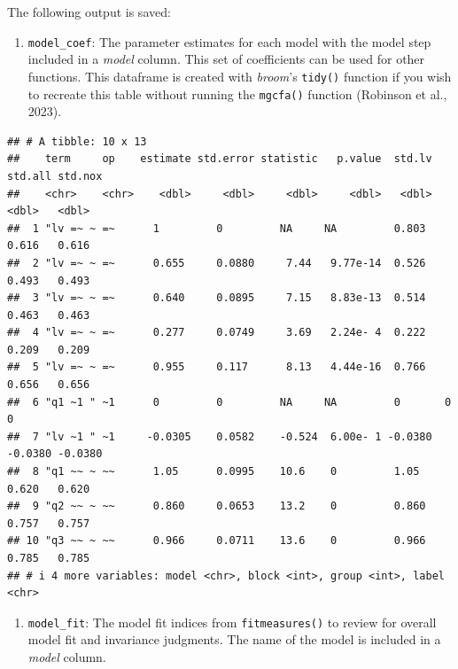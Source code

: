 \documentclass[
  man]{apa7}
\newenvironment{Shaded}{\begin{snugshade}}{\end{snugshade}}
\newcommand{\DecValTok}[1]{\textcolor[rgb]{0.00,0.00,0.81}{#1}}
\newcommand{\NormalTok}[1]{#1}
\newcommand{\SpecialCharTok}[1]{\textcolor[rgb]{0.81,0.36,0.00}{\textbf{#1}}}
\providecommand{\tightlist}{%
  \setlength{\itemsep}{0pt}\setlength{\parskip}{0pt}}
\begin{document}
The following output is saved:

\begin{enumerate}
\def\labelenumi{\arabic{enumi})}
\tightlist
\item
  \texttt{model\_coef}: The parameter estimates for each model with the model step included in a \emph{model} column. This set of coefficients can be used for other functions. This dataframe is created with \emph{broom}'s \texttt{tidy()} function if you wish to recreate this table without running the \texttt{mgcfa()} function (Robinson et al., 2023).
\end{enumerate}

\small

\begin{Shaded}
\end{Shaded}

\normalsize

\begin{verbatim}
## # A tibble: 10 x 13
##    term     op    estimate std.error statistic   p.value  std.lv std.all std.nox
##    <chr>    <chr>    <dbl>     <dbl>     <dbl>     <dbl>   <dbl>   <dbl>   <dbl>
##  1 "lv =~ ~ =~      1         0         NA     NA         0.803   0.616   0.616 
##  2 "lv =~ ~ =~      0.655     0.0880     7.44   9.77e-14  0.526   0.493   0.493 
##  3 "lv =~ ~ =~      0.640     0.0895     7.15   8.83e-13  0.514   0.463   0.463 
##  4 "lv =~ ~ =~      0.277     0.0749     3.69   2.24e- 4  0.222   0.209   0.209 
##  5 "lv =~ ~ =~      0.955     0.117      8.13   4.44e-16  0.766   0.656   0.656 
##  6 "q1 ~1 " ~1      0         0         NA     NA         0       0       0     
##  7 "lv ~1 " ~1     -0.0305    0.0582    -0.524  6.00e- 1 -0.0380 -0.0380 -0.0380
##  8 "q1 ~~ ~ ~~      1.05      0.0995    10.6    0         1.05    0.620   0.620 
##  9 "q2 ~~ ~ ~~      0.860     0.0653    13.2    0         0.860   0.757   0.757 
## 10 "q3 ~~ ~ ~~      0.966     0.0711    13.6    0         0.966   0.785   0.785 
## # i 4 more variables: model <chr>, block <int>, group <int>, label <chr>
\end{verbatim}

\begin{enumerate}
\def\labelenumi{\arabic{enumi})}
\setcounter{enumi}{1}
\tightlist
\item
  \texttt{model\_fit}: The model fit indices from \texttt{fitmeasures()} to review for overall model fit and invariance judgments. The name of the model is included in a \emph{model} column.
\end{enumerate}
\end{document}
